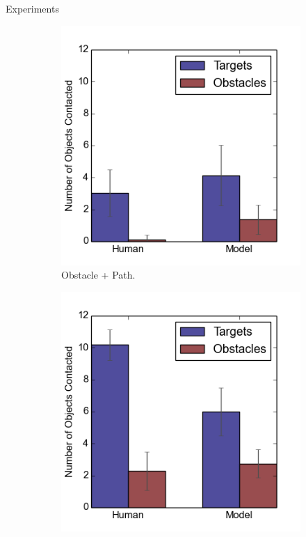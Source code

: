 \documentclass[final]{beamer}
\begin{document}
\begin{frame}{}
\begin{textblock}{37}
\begin{block}{Experiments}
\begin{figure}[h]
\begin{subfigure}[b]{0.24\textwidth}
\includegraphics[width=\textwidth]{contact2.png}
\caption{Obstacle + Path.}
\end{subfigure}
\begin{subfigure}[b]{0.24\textwidth}
\includegraphics[width=\textwidth]{contact3.png}

\end{subfigure}
\end{figure}
\end{block}
\end{textblock}
\end{frame}
\end{document}
